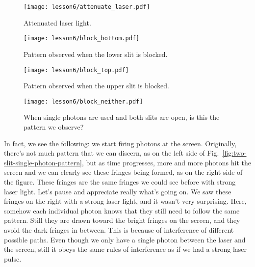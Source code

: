 \begin{figure}[H]
   \centering
    \texttt{[image: lesson6/attenuate\_laser.pdf]}    
        \caption{Attenuated laser light.}
    \label{fig:two-slit-attenuated}
\end{figure}

\begin{figure}[H]
   \centering
    \texttt{[image: lesson6/block\_bottom.pdf]}
    
        \caption{Pattern observed when the lower slit is blocked.}
    \label{fig:two-slit-lower-blocked}
    
\end{figure}

\begin{figure}[H]
   \centering
    \texttt{[image: lesson6/block\_top.pdf]}
    
        \caption{Pattern observed when the upper slit is blocked.}
    \label{fig:two-slit-upper-blocked}
    
\end{figure}


\begin{figure}[H]
   \centering
    \texttt{[image: lesson6/block\_neither.pdf]}
    
        \caption{When single photons are used and both slits are open, is this the pattern we observe?}
    \label{fig:two-slit-single-photon-wrong}
    
\end{figure}

In fact, we see the following: we start firing photons at the screen. Originally, there's not much pattern that we can discern, as on the left side of Fig.~\ref{fig:two-slit-single-photon-pattern}, but as time progresses, more and more photons hit the screen and we can clearly see these fringes being formed, as on the right side of the figure. These fringes are the same fringes we could see before with strong laser light. Let's pause and appreciate really what's going on. We saw these fringes on the right with a strong laser light, and it wasn't very surprising. Here, somehow each individual photon knows that they still need to follow the same pattern. Still they are drawn toward the bright fringes on the screen, and they avoid the dark fringes in between. This is because of interference of different possible paths. Even though we only have a single photon between the laser and the screen, still it obeys the same rules of interference as if we had a strong laser pulse.


